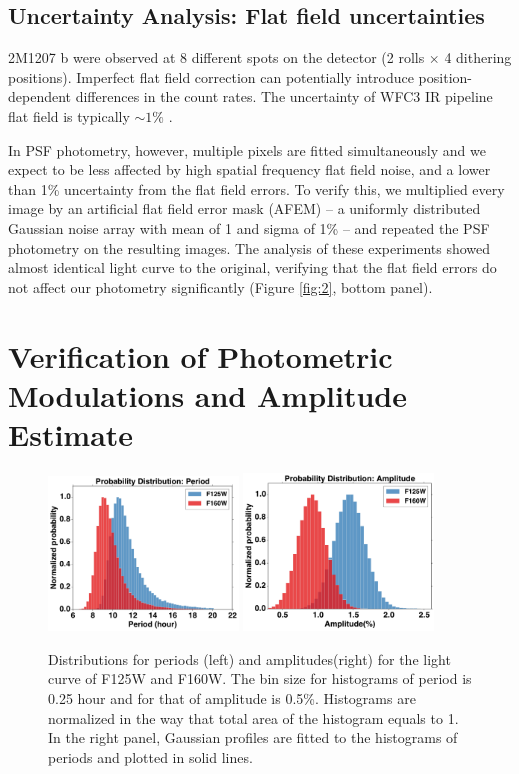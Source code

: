 \documentclass[apj]{emulateapj}
\begin{document}
\subsection{Uncertainty Analysis: Flat field uncertainties}


2M1207 b were observed at 8 different spots on the
detector (2 rolls $\times$ 4 dithering positions). Imperfect flat
field correction can potentially introduce position-dependent differences in the count rates. The
uncertainty of WFC3 IR pipeline flat field is typically $\sim 1\%$
\citep{dressel2012wide}.

In PSF photometry, however, multiple pixels are fitted simultaneously
and we expect to be less affected by high spatial frequency flat field
noise, and a lower than 1\% uncertainty from the flat field
errors. To verify this, we multiplied every image by an artificial flat
field error mask (AFEM) -- a uniformly distributed Gaussian noise array with
mean of 1 and sigma of 1\% -- and repeated the PSF photometry on the
resulting images.  The analysis of these experiments showed almost
identical light curve to the original, verifying that the flat field
errors do not affect our photometry significantly (Figure
\ref{fig:2}, bottom panel).


\section{Verification of Photometric Modulations and Amplitude
  Estimate}

\begin{figure}
  \centering
  \includegraphics[width=0.45\textwidth]{periodDistr}
  \includegraphics[width=0.45\textwidth]{amplitudeDistr}
  \caption{Distributions for periods (left) and amplitudes(right) for the light
    curve of F125W and F160W. The bin size for histograms of period is
  0.25 hour and for that of amplitude is 0.5\%. Histograms are
  normalized in the way that total area of the histogram equals to
  1. In the right panel, Gaussian profiles are fitted to the
  histograms of periods and plotted in solid lines.}
  \label{fig:4}
\end{figure}
\end{document}
